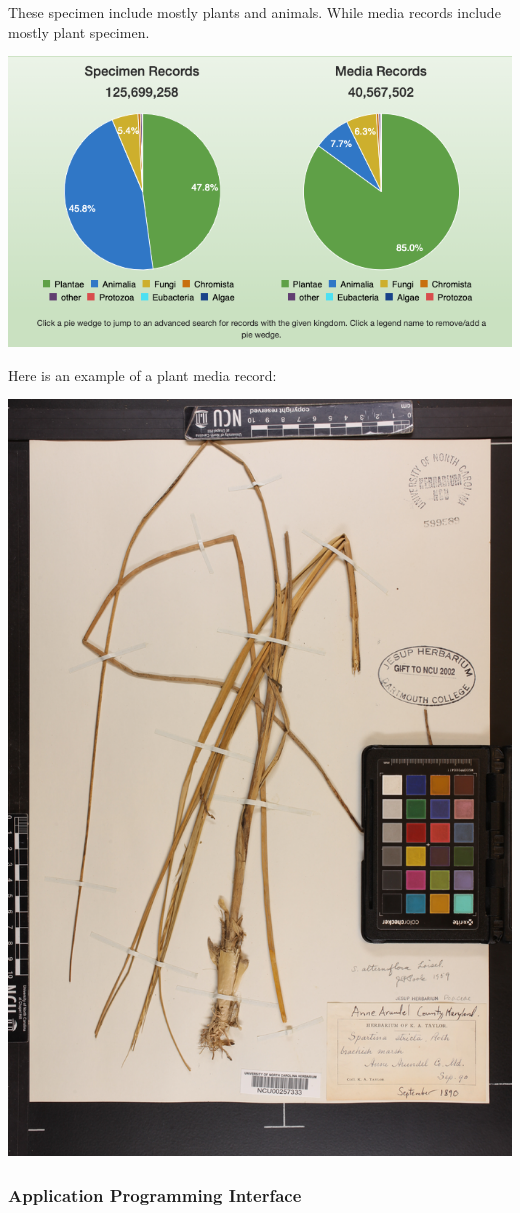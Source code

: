 \documentclass[
]{book}
\begin{document}
These specimen include mostly plants and animals. While media records include mostly plant specimen.

\begin{center}\includegraphics[width=0.7\linewidth]{img/idigbio2} \end{center}

Here is an example of a plant media record:

\begin{center}\includegraphics[width=0.7\linewidth]{img/spartina_idigbio} \end{center}

\hypertarget{application-programming-interface}{%
\subsubsection{Application Programming Interface}\label{application-programming-interface}}
\end{document}
